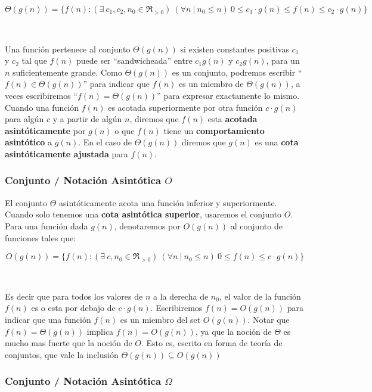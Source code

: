 \documentclass[10pt, a4paper]{report}
\begin{document}
\begin{equation*}
 \Theta(g(n)) = \{ f(n) : (\exists\ c_1, c_2, n_0 \in \Re_{>0}) \ (\forall n\ |\ n_0 \leq n)\ 0 \leq c_1 \cdot g(n) \leq f(n) \leq c_2 \cdot g(n) \}
\end{equation*}

~

Una funci\'on pertenece al conjunto $\Theta(g(n))$ si existen constantes positivas $c_1$ y $c_2$ tal que $f(n)$ puede ser ``sandwicheada'' entre $c_1g(n)$ y $c_2g(n)$, para un $n$ suficientemente grande. Como $\Theta(g(n))$ es un conjunto, podremos escribir ``$f(n) \in \Theta(g(n))$'' para indicar que $f(n)$ es un miembro de $\Theta(g(n))$, a veces escribiremos ``$f(n) = \Theta(g(n))$'' para expresar exactamente lo mismo. Cuando una funci\'on $f(n)$ es acotada superiormente por otra funci\'on $c \cdot g(n)$ para alg\'un $c$ y a partir de alg\'un $n$, diremos que $f(n)$ esta \textbf{acotada asint\'oticamente} por $g(n)$ o que $f(n)$ tiene un \textbf{comportamiento asint\'otico} a $g(n)$. En el caso de $\Theta(g(n))$ diremos que $g(n)$ es una \textbf{cota asint\'oticamente ajustada} para $f(n)$.

\subsubsection{Conjunto / Notaci\'on Asint\'otica $O$}

El conjunto $\Theta$ asint\'oticamente acota una funci\'on inferior y superiormente. Cuando solo tenemos una \textbf{cota asint\'otica superior}, usaremos el conjunto $O$. Para una funci\'on dada $g(n)$, denotaremos por $O(g(n))$ al conjunto de funciones tales que:

\begin{equation*}
 O(g(n)) = \{ f(n) : (\exists\ c, n_0 \in \Re_{>0}) \ (\forall n\ |\ n_0 \leq n)\ 0 \leq f(n) \leq c \cdot g(n) \}
\end{equation*}

~

Es decir que para todos los valores de $n$ a la derecha de $n_0$, el valor de la funci\'on $f(n)$ es o esta por debajo de $c \cdot g(n)$. Escribiremos $f(n) = O(g(n))$ para indicar que una funci\'on $f(n)$ es un miembro del set $O(g(n))$. Notar que $f(n) = \Theta(g(n))$ implica $f(n) = O(g(n))$, ya que la noci\'on de $\Theta$ es mucho mas fuerte que la noci\'on de $O$. Esto es, escrito en forma de teor\'ia de conjuntos, que vale la inclusi\'on $\Theta(g(n)) \subseteq O(g(n))$

\subsubsection{Conjunto / Notaci\'on Asint\'otica $\Omega$}
\end{document}
